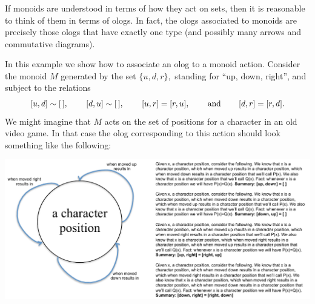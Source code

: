 \documentclass[CT4S-EN-RU]{subfiles}
\begin{document}
\subsubsection{}

\begin{blockENG}
If monoids are understood in terms of how they act on sets, then it is reasonable to think of them in terms of ologs. In fact, the ologs associated to monoids are precisely those ologs that have exactly one type (and possibly many arrows and commutative diagrams).
\end{blockENG}

\begin{blockRUS}
\end{blockRUS}

\begin{exampleENG}\label{ex:monoid as olog}
In this example we show how to associate an olog to a monoid action. Consider the monoid $M$ generated by the set $\{u,d,r\},$ standing for “up, down, right”, and subject to the relations $$[u,d]\sim[\,],\hspace{.3in}[d,u]\sim[\,],\hspace{.3in}[u,r]=[r,u],\hspace{.3in} \textnormal{and}\hspace{.3in} [d,r]=[r,d].$$
We might imagine that $M$ acts on the set of positions for a character in an old video game. In that case the olog corresponding to this action should look something like the following:
\begin{center}
\includegraphics[width=\textwidth]{monoidOlog}
\end{center}
\end{exampleENG}

\begin{exampleRUS}\label{ex:monoid as olog}
\end{exampleRUS}


\subsubsection{}\label{sec:FSMs}
\end{document}
